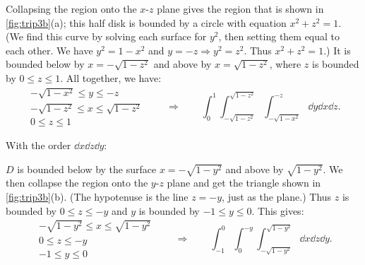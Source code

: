 \begin{example}

Collapsing the region onto the $x$-$z$ plane gives the region that is shown in \autoref{fig:trip3b}(a); this half disk is bounded by a circle with equation $x^2+z^2=1$. (We find this curve by solving each surface for $y^2$, then setting them equal to each other. We have $y^2=1-x^2$ and $y=-z\Rightarrow y^2=z^2$. Thus $x^2+z^2=1$.) It is bounded below by $x=-\sqrt{1-z^2}$ and above by $x=\sqrt{1-z^2}$, where $z$ is bounded by $0\leq z\leq 1$. All together, we have:
\[
 \begin{gathered}
  -\sqrt{1-x^2}\leq y\leq -z\\
  -\sqrt{1-z^2}\leq x\leq \sqrt{1-z^2}\\
  0\leq z\leq 1
 \end{gathered}
 \qquad\Rightarrow\qquad
 \int_{0}^1\int_{-\sqrt{1-z^2}}^{\sqrt{1-z^2}}\int_{-\sqrt{1-x^2}}^{-z}\dd y\dd x\dd z.
\]

\noindent With the order $\dd x\dd z\dd y$:\bigskip

$D$ is bounded below by the surface $x=-\sqrt{1-y^2}$ and above by $\sqrt{1-y^2}$. We then collapse the region onto the $y$-$z$ plane and get the triangle shown in \autoref{fig:trip3b}(b). (The hypotenuse is the line $z=-y$, just as the plane.) Thus $z$ is bounded by $0\leq z\leq -y$ and $y$ is bounded by $-1\leq y\leq 0$. This gives:
\[
 \begin{gathered}
  -\sqrt{1-y^2}\leq x\leq \sqrt{1-y^2}\\
  0\leq z\leq -y\\
  -1\leq y\leq 0
 \end{gathered}
 \qquad\Rightarrow\qquad
 \int_{-1}^0\int_{0}^{-y}\int_{-\sqrt{1-y^2}}^{\sqrt{1-y^2}}\dd x\dd z\dd y.
\]
\end{example}

